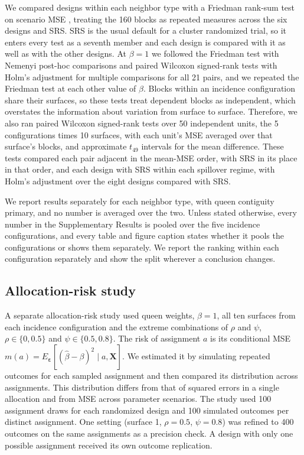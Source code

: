 \documentclass[11pt]{article}
\begin{document}
We compared designs within each neighbor type with a Friedman rank-sum
test on scenario MSE \citep{friedman_use_1937}, treating the 160 blocks
as repeated measures across the six designs and SRS. SRS is the usual default for a cluster randomized trial, so it enters every test as a seventh member and each design is compared with it as well as with the other designs. At \(\beta = 1\) we followed
the Friedman test with Nemenyi post-hoc comparisons
\citep{nemenyi_distributionfree_1963, demsar_statistical_2006} and
paired Wilcoxon signed-rank tests \citep{wilcoxon_individual_1945} with
Holm's adjustment for multiple comparisons \citep{holm_simple_1979} for
all 21 pairs, and we repeated the Friedman test at each other
value of \(\beta\). Blocks within an incidence configuration share their
surfaces, so these tests treat dependent blocks as independent, which
overstates the information about variation from surface to surface. Therefore, we also ran paired Wilcoxon signed-rank tests over 50 independent units, the 5
configurations times 10 surfaces, with each unit's MSE averaged over
that surface's blocks, and approximate \(t_{49}\) intervals for the mean
difference. These tests compared each pair adjacent in the mean-MSE order, with SRS in its place in that order, and each design with SRS within each spillover regime, with Holm's adjustment over the eight designs compared with SRS.

We report results separately for each neighbor type, with queen
contiguity primary, and no number is averaged over the two. Unless
stated otherwise, every number in the Supplementary Results is pooled over the five
incidence configurations, and every table and figure caption states
whether it pools the configurations or shows them separately. We report
the ranking within each configuration separately and show the split
wherever a conclusion changes.


\subsection{Allocation-risk study}\label{allocation-risk-study-design}


A separate allocation-risk study used queen weights, \(\beta=1\), all ten surfaces from each incidence configuration and the extreme combinations of $\rho$ and $\psi$, $\rho\in\{0,0.5\}$ and $\psi\in\{0.5,0.8\}$. The risk of assignment $a$ is its conditional MSE $m(a)=E_{\boldsymbol{\varepsilon}}[(\hat\beta-\beta)^2\mid a,\mathbf{X}]$. We estimated it by simulating repeated outcomes for each sampled assignment and then compared its distribution across assignments. This distribution differs from that
of squared errors in a single allocation and from MSE across parameter
scenarios. The study used 100 assignment draws for each randomized design and 100 simulated outcomes per distinct assignment. One setting (surface 1, $\rho=0.5$, $\psi=0.8$) was refined to 400 outcomes on the same assignments as a precision check. A design with only one possible assignment received its own outcome replication.
\end{document}
